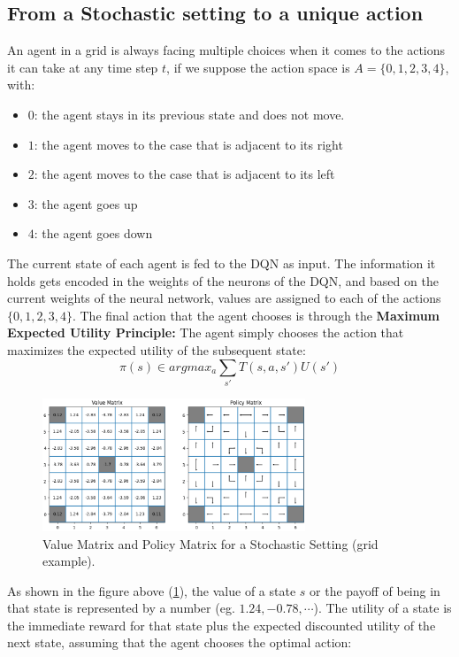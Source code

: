 \subsection{From a Stochastic setting to a unique action}
An agent in a grid is always facing multiple choices when it comes to the actions it can take at any time step $t$, if we suppose the action space is $A=\{ 0,1,2,3,4 \} $, with: 
\begin{itemize}
    \item $0$: the agent stays in its previous state and does not move.
    \item $1$: the agent moves to the case that is adjacent to its right
    \item $2$: the agent moves to the case that is adjacent to its left
    \item $3$: the agent goes up
    \item $4$: the agent goes down
\end{itemize}
The current state of each agent is fed to the DQN as input. The information it holds gets encoded in the weights of the neurons of the DQN, and based on the current weights of the neural network, values are assigned to each of the actions $\{ 0,1,2,3,4 \} $. The final action that the agent chooses is through the \textbf{Maximum Expected Utility Principle:} The agent simply chooses the action that maximizes the expected utility of the subsequent state: 
\begin{equation}
    \pi (s) \in argmax _{a} \sum _{s'} T(s,a,s') U(s')
\end{equation}


\begin{figure}[hbt!]
  \centering
  \includegraphics[width=0.7\textwidth]{images_pfe/1_tT9D_A8yJ0xkoul8e4H3Eg.png}
  \caption{Value Matrix and Policy Matrix for a Stochastic Setting (grid example).}
  \label{fig:value_policy_matrix_grid}
\end{figure}
\FloatBarrier

As shown in the figure above (\ref{fig:value_policy_matrix_grid}), the value of a state $s$ or the payoff of being in that state is represented by a number (eg.  $ 1.24, -0.78, \cdots $). The utility of a state is the immediate reward for that
state plus the expected discounted utility of the next
state, assuming that the agent chooses the optimal
action: 

